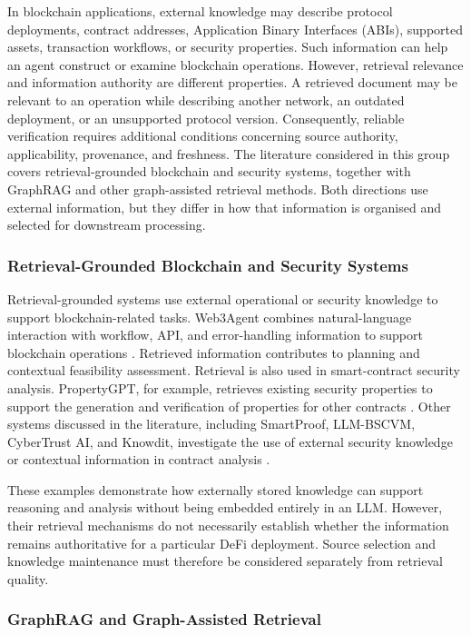 In blockchain applications, external knowledge may describe
protocol deployments, contract addresses, Application Binary
Interfaces (ABIs), supported assets, transaction workflows,
or security properties. Such information can help an agent
construct or examine blockchain operations. However,
retrieval relevance and information authority are different
properties. A retrieved document may be relevant to an
operation while describing another network, an outdated
deployment, or an unsupported protocol version.
Consequently, reliable verification requires additional
conditions concerning source authority, applicability,
provenance, and freshness. The literature considered in this group covers
retrieval-grounded blockchain and security systems,
together with GraphRAG and other graph-assisted retrieval
methods. Both directions use external information, but
they differ in how that information is organised and
selected for downstream processing.

\subsubsection{Retrieval-Grounded Blockchain and Security Systems}

Retrieval-grounded systems use external operational or
security knowledge to support blockchain-related tasks.
Web3Agent combines natural-language interaction with
workflow, API, and error-handling information to support
blockchain operations \cite{TODO_Web3Agent}. Retrieved
information contributes to planning and contextual
feasibility assessment. Retrieval is also used in smart-contract security analysis.
PropertyGPT, for example, retrieves existing security
properties to support the generation and verification
of properties for other contracts
\cite{TODO_PropertyGPT}. Other systems discussed in the
literature, including SmartProof, LLM-BSCVM, CyberTrust AI,
and Knowdit, investigate the use of external security
knowledge or contextual information in contract analysis
\cite{TODO_SmartProof,TODO_LLM_BSCVM,
TODO_CyberTrustAI,TODO_Knowdit}.

These examples demonstrate how externally stored knowledge
can support reasoning and analysis without being embedded
entirely in an LLM. However, their retrieval mechanisms do
not necessarily establish whether the information remains
authoritative for a particular DeFi deployment. Source
selection and knowledge maintenance must therefore be
considered separately from retrieval quality.

\subsubsection{GraphRAG and Graph-Assisted Retrieval}

